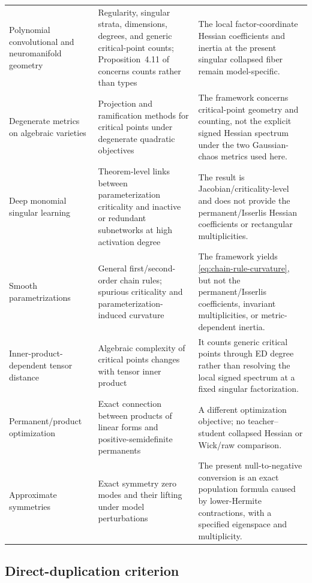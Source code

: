 \documentclass[11pt]{article}
\begin{document}
\begin{longtable}{@{}>{\raggedright\arraybackslash}p{}>{\raggedright\arraybackslash}p{}>{\raggedright\arraybackslash}p{}@{}}
Polynomial convolutional and neuromanifold geometry \cite{shahverdi_polyconv,shahverdi_razor} & Regularity, singular strata, dimensions, degrees, and generic critical-point counts; Proposition~4.11 of \cite{shahverdi_polyconv} concerns counts rather than types & The local factor-coordinate Hessian coefficients and inertia at the present singular collapsed fiber remain model-specific. \\
Degenerate metrics on algebraic varieties \cite{marchetti_degenerate} & Projection and ramification methods for critical points under degenerate quadratic objectives & The framework concerns critical-point geometry and counting, not the explicit signed Hessian spectrum under the two Gaussian-chaos metrics used here. \\
Deep monomial singular learning \cite{kohn_deep_monomial} & Theorem-level links between parameterization criticality and inactive or redundant subnetworks at high activation degree & The result is Jacobian/criticality-level and does not provide the permanent/Isserlis Hessian coefficients or rectangular multiplicities. \\
Smooth parametrizations \cite{levin_kileel_boumal,trager_pure} & General first/second-order chain rules; spurious criticality and parameterization-induced curvature & The framework yields \eqref{eq:chain-rule-curvature}, but not the permanent/Isserlis coefficients, invariant multiplicities, or metric-dependent inertia. \\
Inner-product-dependent tensor distance \cite{kozhasov_inner_products} & Algebraic complexity of critical points changes with tensor inner product & It counts generic critical points through ED degree rather than resolving the local signed spectrum at a fixed singular factorization. \\
Permanent/product optimization \cite{yuan_parrilo} & Exact connection between products of linear forms and positive-semidefinite permanents & A different optimization objective; no teacher--student collapsed Hessian or Wick/raw comparison. \\
Approximate symmetries \cite{kuhn_rosenow} & Exact symmetry zero modes and their lifting under model perturbations & The present null-to-negative conversion is an exact population formula caused by lower-Hermite contractions, with a specified eigenspace and multiplicity. \\
\end{longtable}
\endgroup

\subsection{Direct-duplication criterion}
\end{document}
